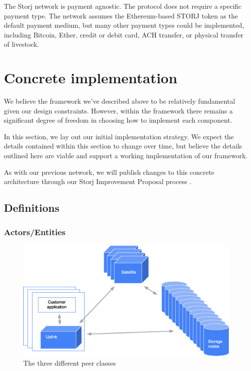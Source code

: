 \documentclass[11pt,fleqn,openany]{book}
\begin{document}
The Storj network is payment agnostic.
The protocol does not require a specific payment type.
The network assumes the Ethereum-based STORJ token as the default payment
medium, but many other payment types could be implemented, including Bitcoin,
Ether, credit or debit card, ACH transfer, or physical transfer of livestock.

\chapter{Concrete implementation}\label{chap:concrete}

We believe the framework we've described above to be relatively fundamental
given our design constraints. However, within the framework there remains a
significant degree of freedom in choosing how to implement each component.

In this section, we lay out our initial implementation strategy. We expect
the details contained within this section to change over time, but believe the
details outlined here are viable and support a working implementation of our
framework.

As with our previous network, we will publish changes to this concrete
architecture through our Storj Improvement Proposal process \cite{sips}.

\section{Definitions}

\subsection{Actors/Entities}

\begin{figure}
\centering
\includegraphics[width=\textwidth]{diagram-drafts/peers.eps}
\caption{The three different peer classes}
\end{figure}
\end{document}
